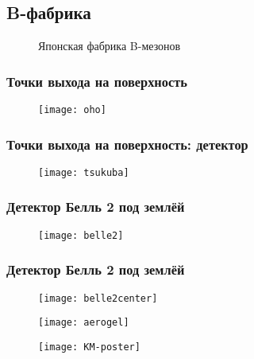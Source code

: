 \subsection{B-фабрика}
\begin{frame}
    \begin{figure}
    {\LARGE Японская фабрика B-мезонов}
    \end{figure}
\end{frame}
\begin{frame}
    \frametitle{Точки выхода на поверхность}
    \begin{figure}
        \begin{centering}
            \texttt{[image: oho]}
        \end{centering}
    \end{figure}
\end{frame}
\begin{frame}
    \frametitle{Точки выхода на поверхность: детектор}
    \begin{figure}
        \begin{centering}
            \texttt{[image: tsukuba]}
        \end{centering}
    \end{figure}
\end{frame}
\begin{frame}
    \frametitle{Детектор Белль 2 под землёй}
    \begin{figure}
        \begin{centering}
            \texttt{[image: belle2]}
        \end{centering}
    \end{figure}
\end{frame}
\begin{frame}
    \frametitle{Детектор Белль 2 под землёй}
    \begin{figure}
        \begin{centering}
            \texttt{[image: belle2center]}
        \end{centering}
    \end{figure}
\end{frame}
\begin{frame}
    \begin{figure}
        \begin{centering}
            \texttt{[image: aerogel]}
        \end{centering}
    \end{figure}
\end{frame}
\begin{frame}
    \begin{figure}
        \begin{centering}
            \texttt{[image: KM-poster]}
        \end{centering}
    \end{figure}
\end{frame}




